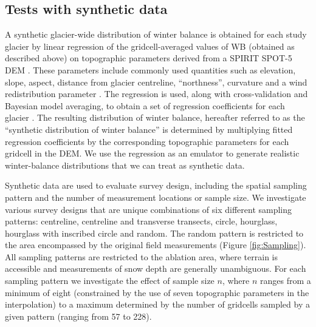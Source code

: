 \documentclass[twocolumn,letterpaper]{igs}
\begin{document}
\subsection{Tests with synthetic data}

A synthetic glacier-wide distribution of winter balance is obtained for each study glacier by linear regression of the gridcell-averaged values of WB (obtained as described above) on topographic parameters derived from a SPIRIT SPOT-5 DEM \citep{Korona2009}. These parameters include commonly used quantities such as elevation, slope, aspect, distance from glacier centreline, ``northness'', curvature and a wind redistribution parameter \citep[e.g.][]{McGrath2015}. The regression is used, along with cross-validation and Bayesian model averaging, to obtain a set of regression coefficients for each glacier \citep{Pulwicki2017}. The resulting distribution of winter balance, hereafter referred to as the ``synthetic distribution of winter balance'' is determined by multiplying fitted regression coefficients by the corresponding topographic parameters for each gridcell in the DEM. We use the regression as an emulator to generate realistic winter-balance distributions that we can treat as synthetic data. 

Synthetic data are used to evaluate survey design, including the spatial sampling pattern and the number of measurement locations or sample size. 
We investigate various survey designs that are unique combinations of six different sampling patterns: centreline, centreline and transverse transects, circle, hourglass, hourglass with inscribed circle and random. The random pattern is restricted to the area encompassed by the original field measurements (Figure \ref{fig:Sampling}). 
All sampling patterns are restricted to the ablation area, where terrain is accessible and measurements of snow depth are generally unambiguous. 
For each sampling pattern we investigate the effect of sample size $n$, where $n$ ranges from a minimum of eight (constrained by the use of seven topographic parameters in the interpolation) to a maximum determined by the number of gridcells sampled by a given pattern (ranging from 57 to 228). 
\end{document}
